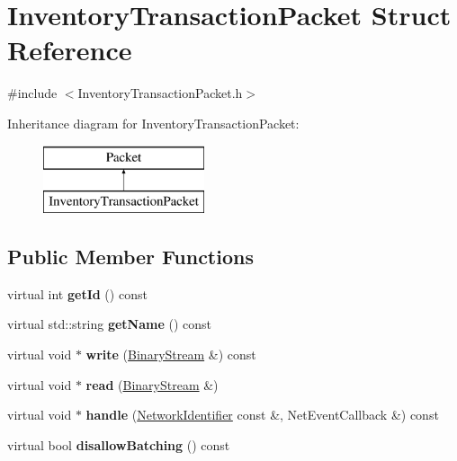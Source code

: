 \hypertarget{struct_inventory_transaction_packet}{}\section{Inventory\+Transaction\+Packet Struct Reference}
\label{struct_inventory_transaction_packet}


{\ttfamily \#include $<$Inventory\+Transaction\+Packet.\+h$>$}

Inheritance diagram for Inventory\+Transaction\+Packet\+:\begin{figure}[H]
\begin{center}
\leavevmode
\includegraphics[height=2.000000cm]{struct_inventory_transaction_packet}
\end{center}
\end{figure}
\subsection*{Public Member Functions}
\begin{DoxyCompactItemize}
\item 
\mbox{\label{struct_inventory_transaction_packet_a56921ecce5af2b1b0fd9f03539e30b2a}} 
virtual int {\bfseries get\+Id} () const
\item 
\mbox{\label{struct_inventory_transaction_packet_a2f49802da6795756f56a6f21b07eda10}} 
virtual std\+::string {\bfseries get\+Name} () const
\item 
\mbox{\label{struct_inventory_transaction_packet_a3f417e6e69bc08db3f6e94c9355fe7ca}} 
virtual void $\ast$ {\bfseries write} (\mbox{\hyperlink{struct_binary_stream}{Binary\+Stream}} \&) const
\item 
\mbox{\label{struct_inventory_transaction_packet_a8ce7ffe0b9506b84bce2410331bbad3c}} 
virtual void $\ast$ {\bfseries read} (\mbox{\hyperlink{struct_binary_stream}{Binary\+Stream}} \&)
\item 
\mbox{\label{struct_inventory_transaction_packet_a17055794f6b238e1f7c7efc86b3312b5}} 
virtual void $\ast$ {\bfseries handle} (\mbox{\hyperlink{struct_network_identifier}{Network\+Identifier}} const \&, Net\+Event\+Callback \&) const
\item 
\mbox{\label{struct_inventory_transaction_packet_a0b6814c77b738615c437ef9a543ae7ed}} 
virtual bool {\bfseries disallow\+Batching} () const
\end{DoxyCompactItemize}
